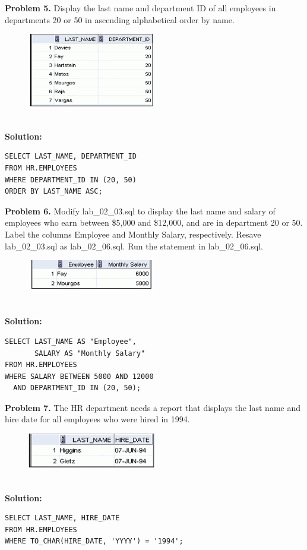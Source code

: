 \documentclass[12pt,a4paper]{article}
\begin{document}
\vspace{0.5cm}

\textbf{Problem 5.} Display the last name and department ID of all employees in departments 20 or 50 in ascending alphabetical order by name.
\begin{figure}[htbp]
  \centering
  \includegraphics[width=0.5\textwidth]{Screenshots/25.png}
\end{figure}\\
\textbf{Solution:}
\begin{lstlisting}[style=sqlstyle]
SELECT LAST_NAME, DEPARTMENT_ID
FROM HR.EMPLOYEES
WHERE DEPARTMENT_ID IN (20, 50)
ORDER BY LAST_NAME ASC;
\end{lstlisting}

\vspace{0.5cm}

\textbf{Problem 6.} Modify lab\_02\_03.sql to display the last name and salary of employees who earn between \$5,000 and \$12,000, and are in department 20 or 50. Label the columns Employee and Monthly Salary, respectively. Resave lab\_02\_03.sql as lab\_02\_06.sql. Run the statement in lab\_02\_06.sql.
\begin{figure}[htbp]
  \centering
  \includegraphics[width=0.5\textwidth]{Screenshots/26.png}
\end{figure}\\
\textbf{Solution:}
\begin{lstlisting}[style=sqlstyle]
SELECT LAST_NAME AS "Employee",
       SALARY AS "Monthly Salary"
FROM HR.EMPLOYEES
WHERE SALARY BETWEEN 5000 AND 12000
  AND DEPARTMENT_ID IN (20, 50);
\end{lstlisting}

\vspace{0.5cm}

\textbf{Problem 7.} The HR department needs a report that displays the last name and hire date for all employees who were hired in 1994.
\begin{figure}[htbp]
  \centering
  \includegraphics[width=0.5\textwidth]{Screenshots/27.png}
\end{figure}\\
\textbf{Solution:}
\begin{lstlisting}[style=sqlstyle]
SELECT LAST_NAME, HIRE_DATE
FROM HR.EMPLOYEES
WHERE TO_CHAR(HIRE_DATE, 'YYYY') = '1994';
\end{lstlisting}
\end{document}
